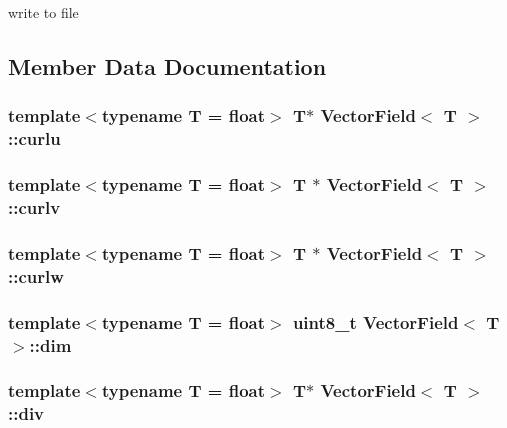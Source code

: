 write to file 



\subsection{Member Data Documentation}
\hypertarget{class_vector_field_a0b4a255f9ef92c902fb4f67f0a8da219}{}
\subsubsection[{curlu}]{\setlength{\rightskip}{0pt plus 5cm}template$<$typename T = float$>$ T$\ast$ {\bf Vector\+Field}$<$ T $>$\+::curlu}\label{class_vector_field_a0b4a255f9ef92c902fb4f67f0a8da219}
\hypertarget{class_vector_field_ad870f5b9d757f0a4c8eb8665c9732871}{}
\subsubsection[{curlv}]{\setlength{\rightskip}{0pt plus 5cm}template$<$typename T = float$>$ T $\ast$ {\bf Vector\+Field}$<$ T $>$\+::curlv}\label{class_vector_field_ad870f5b9d757f0a4c8eb8665c9732871}
\hypertarget{class_vector_field_a4df143789fd195e602b6ef1cb4d9fac1}{}
\subsubsection[{curlw}]{\setlength{\rightskip}{0pt plus 5cm}template$<$typename T = float$>$ T $\ast$ {\bf Vector\+Field}$<$ T $>$\+::curlw}\label{class_vector_field_a4df143789fd195e602b6ef1cb4d9fac1}
\hypertarget{class_vector_field_aa3d7024cb4d87bc1cb33c44a62e74685}{}
\subsubsection[{dim}]{\setlength{\rightskip}{0pt plus 5cm}template$<$typename T = float$>$ uint8\+\_\+t {\bf Vector\+Field}$<$ T $>$\+::dim}\label{class_vector_field_aa3d7024cb4d87bc1cb33c44a62e74685}
\hypertarget{class_vector_field_ab413392c6af739bbcd25a9aa6029cdea}{}
\subsubsection[{div}]{\setlength{\rightskip}{0pt plus 5cm}template$<$typename T = float$>$ T$\ast$ {\bf Vector\+Field}$<$ T $>$\+::div}\label{class_vector_field_ab413392c6af739bbcd25a9aa6029cdea}
\hypertarget{class_vector_field_a107913a4cbfc1601d0be3fad265541ed}{}

